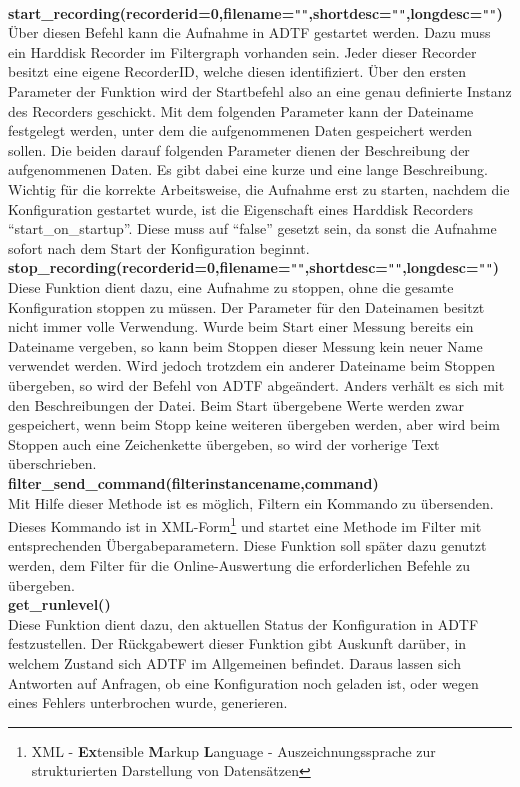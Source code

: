 \documentclass[12pt,a4paper]{report}
\begin{document}
\\[0.5cm]
\textbf{start\_recording(recorderid=0,filename=}\verb|""|\textbf{,shortdesc=}\verb|""|\textbf{,longdesc=}\verb|""|\textbf{)}
\\Über diesen Befehl kann die Aufnahme in ADTF gestartet werden. Dazu muss ein Harddisk Recorder im Filtergraph vorhanden sein. Jeder dieser Recorder besitzt eine eigene RecorderID, welche diesen identifiziert. Über den ersten Parameter der Funktion wird der Startbefehl also an eine genau definierte Instanz des Recorders geschickt. Mit dem folgenden Parameter kann der Dateiname festgelegt werden, unter dem die aufgenommenen Daten gespeichert werden sollen. Die beiden darauf folgenden Parameter dienen der Beschreibung der aufgenommenen Daten. Es gibt dabei eine kurze und eine lange Beschreibung. Wichtig für die korrekte Arbeitsweise, die Aufnahme erst zu starten, nachdem die Konfiguration gestartet wurde, ist die Eigenschaft eines Harddisk Recorders "`start\_on\_startup"'. Diese muss auf "`false"' gesetzt sein, da sonst die Aufnahme sofort nach dem Start der Konfiguration beginnt.
\\[0.5cm]
\textbf{stop\_recording(recorderid=0,filename=}\verb|""|\textbf{,shortdesc=}\verb|""|\textbf{,longdesc=}\verb|""|\textbf{)}
\\Diese Funktion dient dazu, eine Aufnahme zu stoppen, ohne die gesamte Konfiguration stoppen zu müssen. Der Parameter für den Dateinamen besitzt nicht immer volle Verwendung. Wurde beim Start einer Messung bereits ein Dateiname vergeben, so kann beim Stoppen dieser Messung kein neuer Name verwendet werden. Wird jedoch trotzdem ein anderer Dateiname beim Stoppen übergeben, so wird der Befehl von ADTF abgeändert. Anders verhält es sich mit den Beschreibungen der Datei. Beim Start übergebene Werte werden zwar gespeichert, wenn beim Stopp keine weiteren übergeben werden, aber wird beim Stoppen auch eine Zeichenkette übergeben, so wird der vorherige Text überschrieben.
\\[0.5cm]
\textbf{filter\_send\_command(filterinstancename,command)}
\\Mit Hilfe dieser Methode ist es möglich, Filtern ein Kommando zu übersenden. Dieses Kommando ist in XML-Form\footnote{XML - \textbf{Ex}tensible \textbf{M}arkup \textbf{L}anguage - Auszeichnungssprache zur strukturierten Darstellung von Datensätzen} und startet eine Methode im Filter mit entsprechenden Übergabeparametern. Diese Funktion soll später dazu genutzt werden, dem Filter für die Online-Auswertung die erforderlichen Befehle zu übergeben.
\\[0.5cm]
\textbf{get\_runlevel()}
\\Diese Funktion dient dazu, den aktuellen Status der Konfiguration in ADTF festzustellen. Der Rückgabewert dieser Funktion gibt Auskunft darüber, in welchem Zustand sich ADTF im Allgemeinen befindet. Daraus lassen sich Antworten auf Anfragen, ob eine Konfiguration noch geladen ist, oder wegen eines Fehlers unterbrochen wurde, generieren.
\end{document}
